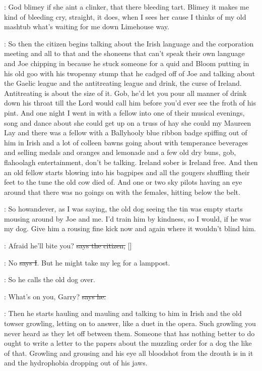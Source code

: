 \tomlinson:
God blimey if she aint a clinker,
that there bleeding tart. Blimey it
makes me kind of bleeding cry, straight, it does, when I sees her cause I
thinks of my old mashtub what's waiting for me down Limehouse way.

\Nq:
So then the citizen begins talking about the Irish language and the
corporation meeting and all to that and the shoneens that can't speak
their own language and Joe chipping in because he stuck someone for
a quid and Bloom putting in his old goo with his twopenny stump that
he cadged off of Joe and talking about the Gaelic league and the
antitreating league and drink, the curse of Ireland. Antitreating
is about the size of it. Gob, he'd let you pour all manner of drink
down his throat till the Lord would call him before you'd ever
see the froth of his pint. And one night I went in with a fellow
into one of their musical evenings, song and dance about she could
get up on a truss of hay she could my Maureen Lay and there was a fellow
with a Ballyhooly blue ribbon badge spiffing out of him in Irish and a lot
of colleen bawns going about with temperance beverages and selling medals
and oranges and lemonade and a few old dry buns, gob, flahoolagh
entertainment, don't be talking. Ireland sober is Ireland free. And then
an old fellow starts blowing into his bagpipes and all the gougers
shuffling their feet to the tune the old cow died of. And one or two sky
pilots having an eye around that there was no goings on with the females,
hitting below the belt.

\Nq:
So howandever, as I was saying, the old dog seeing the tin was empty
starts mousing around by Joe and me. I'd train him by kindness, so I
would, if he was my dog. Give him a rousing fine kick now and again where
it wouldn't blind him.

\citizen:
Afraid he'll bite you?
\sout{says the citizen,} []

:
No \sout{says I}. But he might take my leg for a lamppost.

\Nq:
So he calls the old dog over.

\citizen:
What's on you, Garry? \sout{says he.}

\Nq:
Then he starts hauling and mauling and talking to him in Irish and
the old towser growling, letting on to answer, like a duet in the opera.
Such growling you never heard as they let off between them. Someone that
has nothing better to do ought to write a letter  to the
papers about the muzzling order for a dog the like of that. Growling and
grousing and his eye all bloodshot from the drouth is in it and the
hydrophobia dropping out of his jaws.

